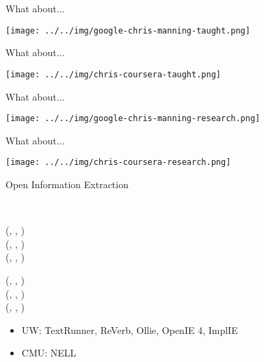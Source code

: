 \def\title{What about...}
\begin{frame}{\title}
\begin{center}
  \texttt{[image: ../../img/google-chris-manning-taught.png]}
\end{center}
\end{frame}
\begin{frame}[noframenumbering]{\title}
\begin{center}
  \texttt{[image: ../../img/chris-coursera-taught.png]} \\
\end{center}
\end{frame}
\begin{frame}[noframenumbering]{\title}
\begin{center}
  \texttt{[image: ../../img/google-chris-manning-research.png]}
\end{center}
\end{frame}
\begin{frame}[noframenumbering]{\title}
\begin{center}
  \texttt{[image: ../../img/chris-coursera-research.png]} \\
\end{center}
\end{frame}

\def\title{Open Information Extraction}
\begin{frame}{\title}
\begin{center}
   \\
\end{center}
\vspace{1em}
\pause

(, , ) \\
(, , ) \\
(, , )
\pause

(, , ) \\
(, , ) \\
(, , ) \\
\vspace{1em}
\pause

\begin{itemize}
  \item UW: TextRunner, ReVerb, Ollie, OpenIE 4, ImplIE
  \item CMU: NELL
\end{itemize}
\end{frame}


